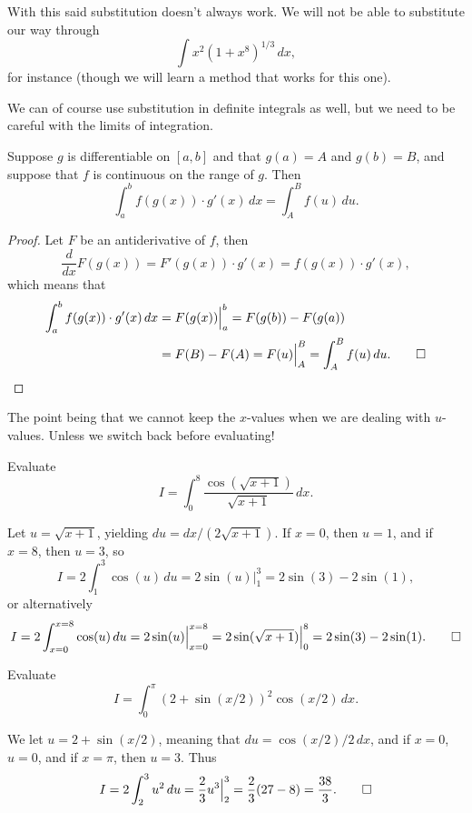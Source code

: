 \noindent
With this said substitution doesn't always work.
We will not be able to substitute our way through
\[
	\int x^2 (1 + x^8)^{1/3} \, d x,
\]
for instance (though we will learn a method that works for this one).

We can of course use substitution in definite integrals as well, but we need to be careful with the limits of integration.

\begin{theorem}
	Suppose $g$ is differentiable on $[a, b]$ and that $g(a) = A$ and $g(b) = B$, and suppose that $f$ is continuous on the range of $g$.
	Then
	\[
		\int_a^b f(g(x)) \cdot g'(x) \, d x = \int_A^B f(u) \, d u.
	\]
\end{theorem}

\begin{proof}
	Let $F$ be an antiderivative of $f$, then
	\[
		\frac{d}{d x} F(g(x)) = F'(g(x)) \cdot g'(x) = f(g(x)) \cdot g'(x),
	\]
	which means that
	\begin{align*}
		\int_a^b f(g(x)) \cdot g'(x) \, d x & = F(g(x)) \Big \rvert_a^b = F(g(b)) - F(g(a))                         \\
		                                    & = F(B) - F(A) = F(u) \Big \rvert_A^B = \int_A^B f(u) \, d u. \qedhere
	\end{align*}
\end{proof}

\noindent
The point being that we cannot keep the $x$-values when we are dealing with $u$-values.
Unless we switch back before evaluating!

\begin{example}
	Evaluate
	\[
		I = \int_0^8 \frac{\cos(\sqrt{x + 1})}{\sqrt{x + 1}} \, d x.
	\]

	\noindent
	Let $u = \sqrt{x + 1}$, yielding $d u = d x / (2 \sqrt{x + 1})$.
	If $x = 0$, then $u = 1$, and if $x = 8$, then $u = 3$, so
	\[
		I = 2 \int_1^3 \cos(u) \, d u = 2 \sin(u) \Big \rvert_1^3 = 2 \sin(3) - 2 \sin(1),
	\]
	or alternatively
	\[
		I = 2 \int_{x = 0}^{x = 8} \cos(u) \, d u = 2 \sin(u) \Big \rvert_{x = 0}^{x = 8} = 2 \sin(\sqrt{x + 1}) \Big \rvert_0^8 = 2 \sin(3) - 2 \sin(1). \qedhere
	\]
\end{example}

\begin{example}
	Evaluate
	\[
		I = \int_0^\pi (2 + \sin(x / 2))^2 \cos(x / 2) \, d x.
	\]

	\noindent
	We let $u = 2 + \sin(x / 2)$, meaning that $d u = \cos(x / 2) / 2 \, d x$, and if $x = 0$, $u = 0$, and if $x = \pi$, then $u = 3$.
	Thus
	\[
		I = 2 \int_2^3 u^2 \, d u = \frac{2}{3} u^3 \Big \rvert_2^3 = \frac{2}{3} (27 - 8) = \frac{38}{3}. \qedhere
	\]
\end{example}

